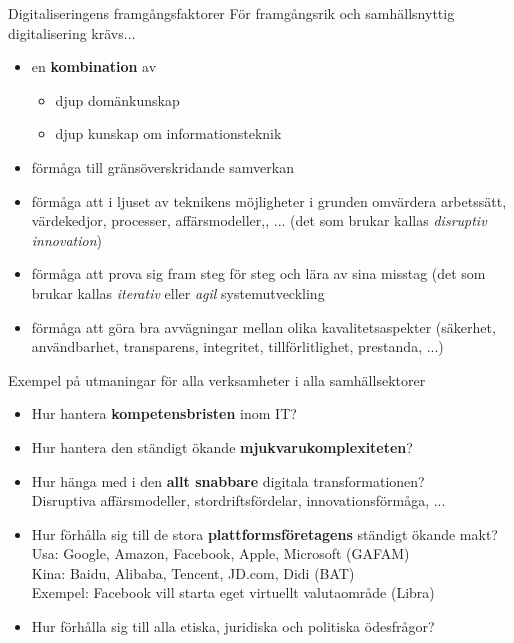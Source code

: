 \documentclass[aspectratio=169]{beamer}
\newenvironment{Slide}[1]%
  {\begin{frame}[environment=Slide]{#1}}
  {\end{frame}}%
\begin{document}
\begin{Slide}{Digitaliseringens framgångsfaktorer}
  För framgångsrik och samhällsnyttig digitalisering krävs...
  \begin{itemize}
    \item  en \textbf{kombination} av
    \begin{itemize}
      \item djup domänkunskap
      \item djup kunskap om informationsteknik
    \end{itemize}
    \item förmåga till gränsöverskridande samverkan
    \item förmåga att i ljuset av teknikens möjligheter i grunden omvärdera arbetssätt, värdekedjor, processer, affärsmodeller,, ... (det som brukar kallas \emph{disruptiv innovation})
    \item förmåga att prova sig fram steg för steg och lära av sina misstag (det som brukar kallas \emph{iterativ} eller \emph{agil} systemutveckling
    \item förmåga att göra bra avvägningar mellan olika kavalitetsaspekter (säkerhet, användbarhet, transparens, integritet, tillförlitlighet, prestanda, ...)
  \end{itemize}
  
\end{Slide}


\begin{Slide}{Exempel på utmaningar för alla verksamheter i alla samhällsektorer}
  \begin{itemize}
    \item Hur hantera \textbf{kompetensbristen} inom IT?
    \item Hur hantera den ständigt ökande \textbf{mjukvarukomplexiteten}?
    \item Hur hänga med i den \textbf{allt snabbare} digitala transformationen? \\ Disruptiva affärsmodeller, stordriftsfördelar, innovationsförmåga, ... 
    \item Hur förhålla sig till de stora \textbf{plattformsföretagens} ständigt ökande makt? \\ 
          Usa: Google, Amazon, Facebook, Apple, Microsoft \hfill(GAFAM)\\
          Kina: Baidu, Alibaba, Tencent, JD.com, Didi \hfill (BAT) \\
          Exempel: Facebook vill starta eget virtuellt valutaområde \hfill (Libra)
    \item Hur förhålla sig till alla etiska, juridiska och politiska ödesfrågor?
  \end{itemize}
\end{Slide}
\end{document}
